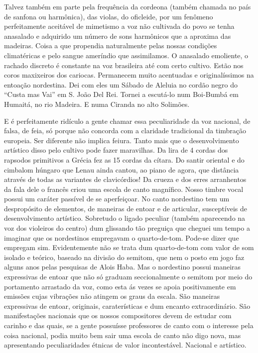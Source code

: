 Talvez também em parte pela frequência da cordeona (também chamada no
país de sanfona ou harmônica), das violas, do oficleide, por um fenômeno
perfeitamente aceitável de mimetismo a voz não cultivada do povo se
tenha anasalado e adquirido um número de sons harmônicos que a aproxima
das madeiras. Coisa a que propendia naturalmente pelas nossas condições
climatéricas e pelo sangue ameríndio que assimilamos. O anasalado
emoliente, o rachado discreto é constante na voz brasileira até com
certo cultivo. Estão nos coros maxixeiros dos cariocas. Permanecem muito
acentuadas e originalíssimos na entoação nordestina. Dei com eles um
Sábado de Aleluia no cordão negro do ``Custa mas Vai'' em S. João Del Rei.
Tornei a escutá-lo num Boi-Bumbá em Humaitá, no rio Madeira. E numa
Ciranda no alto Solimões.

E é perfeitamente ridículo a gente chamar essa peculiaridade da voz
nacional, de falsa, de feia, só porque não concorda com a claridade
tradicional da timbração europeia. Ser diferente não implica feiura.
Tanto mais que o desenvolvimento artístico disso pelo cultivo pode fazer
maravilhas. Da lira de 4 cordas dos rapsodos primitivos a Grécia fez as
15 cordas da cítara. Do santir oriental e do cimbalom húngaro que Lenau
ainda cantou, ao piano de agora, que distância através de todas as
variantes de clavicórdios! Da crueza e dos erres arranhentos da fala
dele o francês criou uma escola de canto magnífico. Nosso timbre vocal
possui um caráter passível de se aperfeiçoar. No canto nordestino tem um
despropósito de elementos, de maneiras de entoar e de articular,
susceptíveis de desenvolvimento artístico. Sobretudo o ligado peculiar
(também aparecendo na voz dos violeiros do centro) dum glissando tão
preguiça que cheguei um tempo a imaginar que os nordestinos empregavam o
quarto-de-tom. Pode-se dizer que empregam sim. Evidentemente não se
trata dum quarto-de-tom com valor de som isolado e teórico, baseado na
divisão do semitom, que nem o posto em jogo faz alguns anos pelas
pesquisas de Alois Haba. Mas o nordestino possui maneiras expressivas de
entoar que não só graduam seccionalmente o semitom por meio do
portamento arrastado da voz, como esta ás vezes se apoia positivamente
em emissões cujas vibrações não atingem os graus da escala. São maneiras
expressivas de entoar, originais, caraterísticas e dum encanto
extraordinário. São manifestações nacionais que os nossos compositores
devem de estudar com carinho e das quais, se a gente possuísse
professores de canto com o interesse pela coisa nacional, podia muito
bem sair uma escola de canto não digo nova, mas apresentando
peculiaridades étnicas de valor incontestável. Nacional e artístico.

